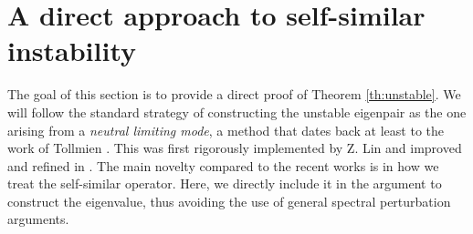 \documentclass[11pt,reqno]{amsproc}
\theoremstyle{definition}
\theoremstyle{definition}
\numberwithin{equation}{section}
\begin{document}
\section{A direct approach to self-similar instability}
\label{sec:instability}
The goal of this section is to provide a direct proof of Theorem \ref{th:unstable}. We will follow the standard strategy of constructing the unstable eigenpair as the one arising from a \textit{neutral limiting mode}, a method that dates back at least to the work of Tollmien \cite{tollmien1935allgemeines}. This was first rigorously implemented by Z. Lin \cite{lin2003instability} and improved and refined in \cite{vishik_notes}. The main novelty compared to the recent works \cite{vishik_notes, vishik2018instability1,vishik2018instability2, castro2024proof} is in how we treat the self-similar operator. Here, we directly include it in the argument to construct the eigenvalue, thus avoiding the use of general spectral perturbation arguments.
\end{document}
